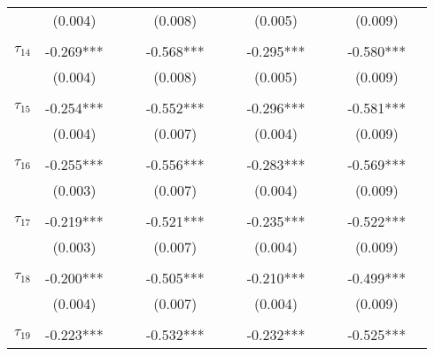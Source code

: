 \begin{tabular}{@{\extracolsep{-2pt}}lccccccccccc}
            &  (0.004)  &&      &  (0.008)  &          &&  (0.005)  &&      &  (0.009)  &            \\
            &           &&      &           &          &&           &&      &           &            \\[-2.1ex]
$\tau_{14}$ & -0.269*** &&      & -0.568*** &          && -0.295*** &&      & -0.580*** &            \\
            &  (0.004)  &&      &  (0.008)  &          &&  (0.005)  &&      &  (0.009)  &            \\
            &           &&      &           &          &&           &&      &           &            \\[-2.1ex]
$\tau_{15}$ & -0.254*** &&      & -0.552*** &          && -0.296*** &&      & -0.581*** &            \\
            &  (0.004)  &&      &  (0.007)  &          &&  (0.004)  &&      &  (0.009)  &            \\
            &           &&      &           &          &&           &&      &           &            \\[-2.1ex]
$\tau_{16}$ & -0.255*** &&      & -0.556*** &          && -0.283*** &&      & -0.569*** &            \\
            &  (0.003)  &&      &  (0.007)  &          &&  (0.004)  &&      &  (0.009)  &            \\
            &           &&      &           &          &&           &&      &           &            \\[-2.1ex]
$\tau_{17}$ & -0.219*** &&      & -0.521*** &          && -0.235*** &&      & -0.522*** &            \\
            &  (0.003)  &&      &  (0.007)  &          &&  (0.004)  &&      &  (0.009)  &            \\
            &           &&      &           &          &&           &&      &           &            \\[-2.1ex]
$\tau_{18}$ & -0.200*** &&      & -0.505*** &          && -0.210*** &&      & -0.499*** &            \\
            &  (0.004)  &&      &  (0.007)  &          &&  (0.004)  &&      &  (0.009)  &            \\
            &           &&      &           &          &&           &&      &           &            \\[-2.1ex]
$\tau_{19}$ & -0.223*** &&      & -0.532*** &          && -0.232*** &&      & -0.525*** &            \\

\end{tabular}
